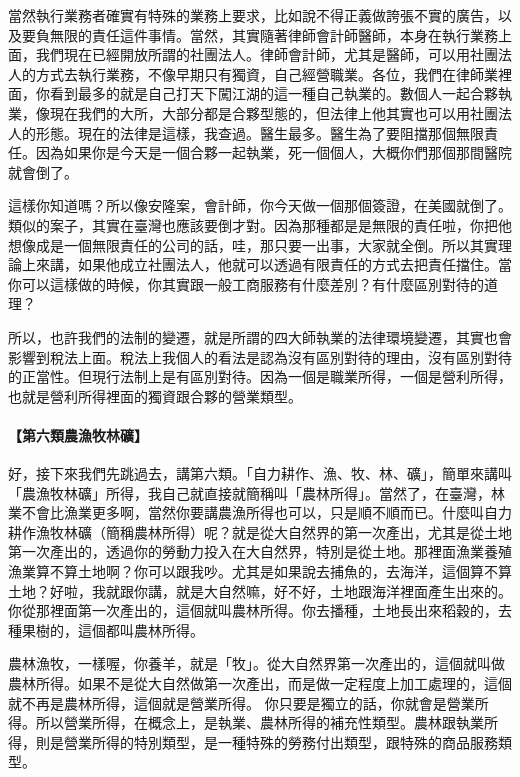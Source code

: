 \documentclass[oneside,sub3section]{ctexbook}
\let\oldparagraph\paragraph
\renewcommand{\paragraph}[1]{\oldparagraph{#1}\mbox{}}
\begin{document}
當然執行業務者確實有特殊的業務上要求，比如說不得正義做誇張不實的廣告，以及要負無限的責任這件事情。當然，其實隨著律師會計師醫師，本身在執行業務上面，我們現在已經開放所謂的社團法人。律師會計師，尤其是醫師，可以用社團法人的方式去執行業務，不像早期只有獨資，自己經營職業。各位，我們在律師業裡面，你看到最多的就是自己打天下闖江湖的這一種自己執業的。數個人一起合夥執業，像現在我們的大所，大部分都是合夥型態的，但法律上他其實也可以用社團法人的形態。現在的法律是這樣，我查過。醫生最多。醫生為了要阻擋那個無限責任。因為如果你是今天是一個合夥一起執業，死一個個人，大概你們那個那間醫院就會倒了。

這樣你知道嗎？所以像安隆案，會計師，你今天做一個那個簽證，在美國就倒了。類似的案子，其實在臺灣也應該要倒才對。因為那種都是是無限的責任啦，你把他想像成是一個無限責任的公司的話，哇，那只要一出事，大家就全倒。所以其實理論上來講，如果他成立社團法人，他就可以透過有限責任的方式去把責任擋住。當你可以這樣做的時候，你其實跟一般工商服務有什麼差別？有什麼區別對待的道理？

所以，也許我們的法制的變遷，就是所謂的四大師執業的法律環境變遷，其實也會影響到稅法上面。稅法上我個人的看法是認為沒有區別對待的理由，沒有區別對待的正當性。但現行法制上是有區別對待。因為一個是職業所得，一個是營利所得，也就是營利所得裡面的獨資跟合夥的營業類型。

\hypertarget{ux7b2cux516dux985eux8fb2ux6f01ux7267ux6797ux7926}{%
\paragraph{【第六類農漁牧林礦】}\label{ux7b2cux516dux985eux8fb2ux6f01ux7267ux6797ux7926}}

好，接下來我們先跳過去，講第六類。「自力耕作、漁、牧、林、礦」，簡單來講叫「農漁牧林礦」所得，我自己就直接就簡稱叫「農林所得」。當然了，在臺灣，林業不會比漁業更多啊，當然你要講農漁所得也可以，只是順不順而已。什麼叫自力耕作漁牧林礦（簡稱農林所得）呢？就是從大自然界的第一次產出，尤其是從土地第一次產出的，透過你的勞動力投入在大自然界，特別是從土地。那裡面漁業養殖漁業算不算土地啊？你可以跟我吵。尤其是如果說去捕魚的，去海洋，這個算不算土地？好啦，我就跟你講，就是大自然嘛，好不好，土地跟海洋裡面產生出來的。你從那裡面第一次產出的，這個就叫農林所得。你去播種，土地長出來稻穀的，去種果樹的，這個都叫農林所得。

農林漁牧，一樣喔，你養羊，就是「牧」。從大自然界第一次產出的，這個就叫做農林所得。如果不是從大自然做第一次產出，而是做一定程度上加工處理的，這個就不再是農林所得，這個就是營業所得。
你只要是獨立的話，你就會是營業所得。所以營業所得，在概念上，是執業、農林所得的補充性類型。農林跟執業所得，則是營業所得的特別類型，是一種特殊的勞務付出類型，跟特殊的商品服務類型。
\end{document}
